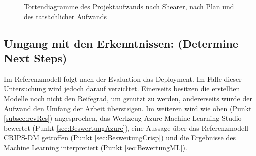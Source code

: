 \begin{figure}[H]
\centering
{}
\caption{Tortendiagramme des Projektaufwands nach Shearer, nach Plan und des tatsächlicher Aufwands}
\label{fig:phases}
\end{figure}

\subsection*{Umgang mit den Erkenntnissen: (Determine Next Steps)}
Im Referenzmodell folgt nach der Evaluation das Deployment. Im Falle dieser Untersuchung wird jedoch darauf verzichtet. Einerseits besitzen die erstellten Modelle noch nicht den Reifegrad, um genutzt zu werden, andererseits würde der Aufwand den Umfang der Arbeit übersteigen.
Im weiteren wird wie oben (Punkt \ref{subsec:revRes}) angesprochen, das Werkzeug Azure Machine Learning Studio bewertet (Punkt \ref{sec:BeswertungAzure}), eine Aussage über das Referenzmodell CRIPS-DM getroffen (Punkt \ref{sec:BeswertungCrisp}) und die Ergebnisse des Machine Learning interpretiert (Punkt \ref{sec:BewertungML}).




